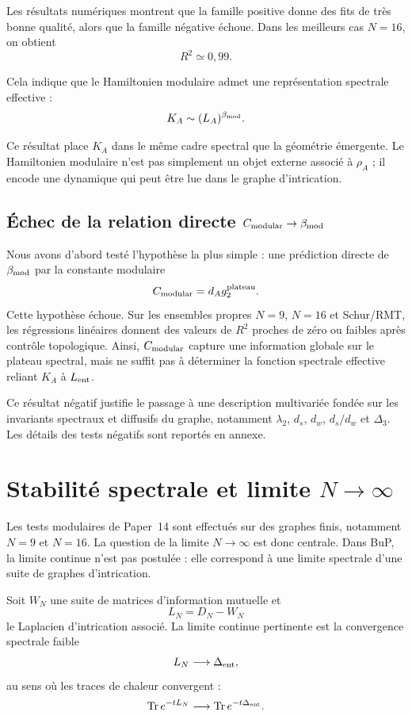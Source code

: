 \documentclass[11pt,a4paper]{article}
\begin{document}
Les résultats numériques montrent que la famille positive donne des fits de
très bonne qualité, alors que la famille négative échoue. Dans les meilleurs
cas \(N=16\), on obtient
\[
R^2 \simeq 0{,}99.
\]

Cela indique que le Hamiltonien modulaire admet une représentation spectrale
effective :
\[
K_A \sim (L_A)^{\beta_{\rm mod}}.
\]

Ce résultat place \(K_A\) dans le même cadre spectral que la géométrie
émergente. Le Hamiltonien modulaire n'est pas simplement un objet externe
associé à \(\rho_A\) ; il encode une dynamique qui peut être lue dans le
graphe d'intrication.

\subsection{Échec de la relation directe \(C_{\rm modular}\to\beta_{\rm mod}\)}

Nous avons d'abord testé l'hypothèse la plus simple : une prédiction directe
de \(\beta_{\rm mod}\) par la constante modulaire
\[
C_{\rm modular}=d_A g_2^{\rm plateau}.
\]
Cette hypothèse échoue. Sur les ensembles propres \(N=9\), \(N=16\) et
Schur/RMT, les régressions linéaires donnent des valeurs de \(R^2\) proches
de zéro ou faibles après contrôle topologique. Ainsi, \(C_{\rm modular}\)
capture une information globale sur le plateau spectral, mais ne suffit pas
à déterminer la fonction spectrale effective reliant \(K_A\) à \(L_{\rm ent}\).

Ce résultat négatif justifie le passage à une description multivariée fondée
sur les invariants spectraux et diffusifs du graphe, notamment
\(\lambda_2\), \(d_s\), \(d_w\), \(d_s/d_w\) et \(\Delta_3\). Les détails
des tests négatifs sont reportés en annexe.

\section{Stabilité spectrale et limite \(N\to\infty\)}

Les tests modulaires de Paper~14 sont effectués sur des graphes finis,
notamment \(N=9\) et \(N=16\). La question de la limite \(N\to\infty\) est
donc centrale. Dans BuP, la limite continue n'est pas postulée : elle
correspond à une limite spectrale d'une suite de graphes d'intrication.

Soit \(W_N\) une suite de matrices d'information mutuelle et
\[
L_N=D_N-W_N
\]
le Laplacien d'intrication associé. La limite continue pertinente est la
convergence spectrale faible
\[
L_N\longrightarrow \Delta_{\rm ent},
\]
au sens où les traces de chaleur convergent :
\[
{\rm Tr}\,e^{-tL_N}
\longrightarrow
{\rm Tr}\,e^{-t\Delta_{\rm ent}}.
\]
\end{document}

